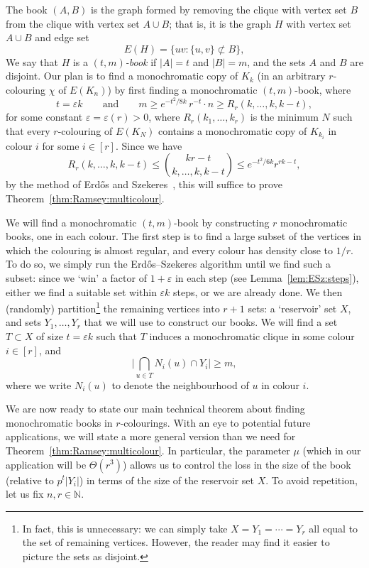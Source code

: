 \documentclass[12pt,reqno]{amsart}
\theoremstyle{definition}
\theoremstyle{remark}
\newcommand\N{\mathbb{N}}
\newcommand\eps{\varepsilon}
\renewcommand{\le}{\leqslant}
\renewcommand{\ge}{\geqslant}
\def\eps{\varepsilon}
\def\N{\mathbb{N}}
\begin{document}
The book $(A,B)$ is the graph formed by removing the clique with vertex set $B$ from the clique with vertex set $A \cup B$; that is, it is the graph $H$ with vertex set $A \cup B$ and edge set
$$E(H) = \big\{ uv : \{u,v\} \not\subset B \big\},$$
We say that $H$ is a \emph{$(t,m)$-book} if $|A| = t$ and $|B|= m$, and the sets $A$ and $B$ are disjoint. Our plan is to find a monochromatic copy of $K_k$ (in an arbitrary $r$-colouring $\chi$ of $E(K_n)$) by first finding a monochromatic $(t,m)$-book, where
$$t = \eps k \qquad \text{and} \qquad m \ge e^{-t^2/8k} \, r^{-t} \cdot n \ge R_r(k,\ldots,k,k-t),$$
for some constant $\eps = \eps(r) > 0$, where $R_r(k_1,\ldots,k_r)$ is the minimum $N$ such that every $r$-colouring of $E(K_N)$ contains a monochromatic copy of $K_{k_i}$ in colour $i$ for some $i \in [r]$. Since we have
$$R_r(k,\ldots,k,k-t) \le {kr - t \choose k,\ldots,k,k-t} \le e^{-t^2/6k} r^{rk-t},$$
by the method of Erd\H{o}s and Szekeres~\cite{ESz35}, this will suffice to prove Theorem~\ref{thm:Ramsey:multicolour}. 

We will find a monochromatic $(t,m)$-book by constructing $r$ monochromatic books, one in each colour. The first step is to find a large subset of the vertices in which the colouring is almost regular, and every colour has density close to $1/r$. To do so, we simply run the Erd\H{o}s--Szekeres algorithm until we find such a subset: since we `win' a factor of $1 + \eps$ in each step (see Lemma~\ref{lem:ESz:steps}), either we find a suitable set within $\eps k$ steps, or we are already done. We then (randomly) partition\footnote{In fact, this is unnecessary: we can simply take $X = Y_1 = \cdots = Y_r$ all equal to the set of remaining vertices. However, the reader may find it easier to picture the sets as disjoint.} the remaining vertices into $r+1$ sets: a `reservoir' set $X$, and sets $Y_1,\ldots,Y_r$ that we will use to construct our books. We will find a set $T \subset X$ of size $t = \eps k$ such that $T$ induces a monochromatic clique in some colour $i \in [r]$, and 
$$\bigg| \bigcap_{u \in T} N_i(u) \cap Y_i \bigg| \ge m,$$
where we write $N_i(u)$ to denote the neighbourhood of $u$ in colour $i$. 

We are now ready to state our main technical theorem about finding monochromatic books in $r$-colourings. With an eye to potential future applications, we will state a more general version than we need for Theorem~\ref{thm:Ramsey:multicolour}. In particular, the parameter $\mu$ (which in our application will be $\Theta(r^3)$) allows us to control the loss in the size of the book (relative to $p^t |Y_i|$) in terms of the size of the reservoir set $X$. To avoid repetition, let us fix $n,r \in \N$.
\end{document}
